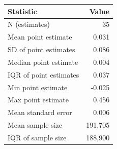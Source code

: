\begin{tabular}{@{}l r@{}}
\toprule
Statistic & Value \\
\midrule
N (estimates) & 35 \\
Mean point estimate & 0.031 \\
SD of point estimates & 0.086 \\
Median point estimate & 0.004 \\
IQR of point estimates & 0.037 \\
Min point estimate & -0.025 \\
Max point estimate & 0.456 \\
Mean standard error & 0.006 \\
Mean sample size & 191,705 \\
IQR of sample size & 188,900 \\
\bottomrule
\end{tabular}
